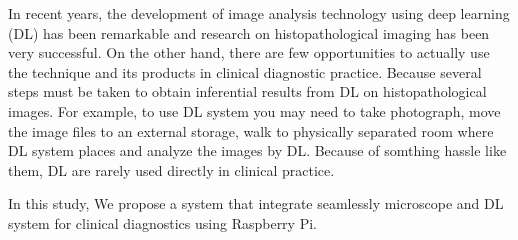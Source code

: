 In recent years, the development of image analysis technology using deep learning (DL) has been remarkable and research on histopathological imaging has been very successful.  On the other hand, there are few opportunities to actually use the technique and its products in clinical diagnostic practice. Because several steps must be taken to obtain inferential results from DL on histopathological images. For example, to use DL system you may need to take photograph, move the image files to an external storage, walk to physically separated room where DL system places and analyze the images by DL. Because of somthing hassle like them, DL are rarely used directly in clinical practice. \par

\vspace{0.5zh}

In this study, We propose a system that integrate seamlessly microscope and DL system for clinical diagnostics using Raspberry Pi.\par
